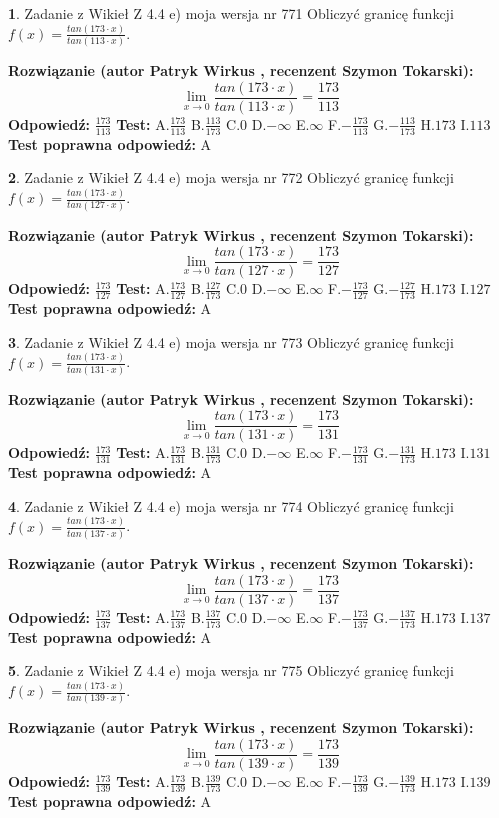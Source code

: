 \documentclass[12pt, a4paper]{article}
\theoremstyle{definition} %
\newtheorem{zad}{}
\newcommand{\zadStart}[1]{\begin{zad}#1\newline}
\newcommand{\zadStop}{\end{zad}}
\newcommand{\rozwStart}[2]{\noindent \textbf{Rozwiązanie (autor #1 , recenzent #2): }\newline}
\newcommand{\rozwStop}{\newline}
\newcommand{\odpStart}{\noindent \textbf{Odpowiedź:}\newline}
\newcommand{\odpStop}{\newline}
\newcommand{\testStart}{\noindent \textbf{Test:}\newline}
\newcommand{\testStop}{\newline}
\newcommand{\kluczStart}{\noindent \textbf{Test poprawna odpowiedź:}\newline}
\newcommand{\kluczStop}{\newline}
\begin{document}
\zadStart{Zadanie z Wikieł Z 4.4 e) moja wersja nr 771}
Obliczyć granicę funkcji $f(x)=\frac{tan(173\cdot x)}{tan(113\cdot x)}$.
\zadStop
\rozwStart{Patryk Wirkus}{Szymon Tokarski}
$$\lim\limits_{x\to 0}\frac{tan(173\cdot x)}{tan(113\cdot x)}=
\frac{173}{113}$$
\rozwStop
\odpStart
$\frac{173}{113}$
\odpStop
\testStart
A.$\frac{173}{113}$
B.$\frac{113}{173}$
C.$0$
D.$-\infty$
E.$\infty$
F.$-\frac{173}{113}$
G.$-\frac{113}{173}$
H.$173$
I.$113$
\testStop
\kluczStart
A
\kluczStop



\zadStart{Zadanie z Wikieł Z 4.4 e) moja wersja nr 772}
Obliczyć granicę funkcji $f(x)=\frac{tan(173\cdot x)}{tan(127\cdot x)}$.
\zadStop
\rozwStart{Patryk Wirkus}{Szymon Tokarski}
$$\lim\limits_{x\to 0}\frac{tan(173\cdot x)}{tan(127\cdot x)}=
\frac{173}{127}$$
\rozwStop
\odpStart
$\frac{173}{127}$
\odpStop
\testStart
A.$\frac{173}{127}$
B.$\frac{127}{173}$
C.$0$
D.$-\infty$
E.$\infty$
F.$-\frac{173}{127}$
G.$-\frac{127}{173}$
H.$173$
I.$127$
\testStop
\kluczStart
A
\kluczStop



\zadStart{Zadanie z Wikieł Z 4.4 e) moja wersja nr 773}
Obliczyć granicę funkcji $f(x)=\frac{tan(173\cdot x)}{tan(131\cdot x)}$.
\zadStop
\rozwStart{Patryk Wirkus}{Szymon Tokarski}
$$\lim\limits_{x\to 0}\frac{tan(173\cdot x)}{tan(131\cdot x)}=
\frac{173}{131}$$
\rozwStop
\odpStart
$\frac{173}{131}$
\odpStop
\testStart
A.$\frac{173}{131}$
B.$\frac{131}{173}$
C.$0$
D.$-\infty$
E.$\infty$
F.$-\frac{173}{131}$
G.$-\frac{131}{173}$
H.$173$
I.$131$
\testStop
\kluczStart
A
\kluczStop



\zadStart{Zadanie z Wikieł Z 4.4 e) moja wersja nr 774}
Obliczyć granicę funkcji $f(x)=\frac{tan(173\cdot x)}{tan(137\cdot x)}$.
\zadStop
\rozwStart{Patryk Wirkus}{Szymon Tokarski}
$$\lim\limits_{x\to 0}\frac{tan(173\cdot x)}{tan(137\cdot x)}=
\frac{173}{137}$$
\rozwStop
\odpStart
$\frac{173}{137}$
\odpStop
\testStart
A.$\frac{173}{137}$
B.$\frac{137}{173}$
C.$0$
D.$-\infty$
E.$\infty$
F.$-\frac{173}{137}$
G.$-\frac{137}{173}$
H.$173$
I.$137$
\testStop
\kluczStart
A
\kluczStop



\zadStart{Zadanie z Wikieł Z 4.4 e) moja wersja nr 775}
Obliczyć granicę funkcji $f(x)=\frac{tan(173\cdot x)}{tan(139\cdot x)}$.
\zadStop
\rozwStart{Patryk Wirkus}{Szymon Tokarski}
$$\lim\limits_{x\to 0}\frac{tan(173\cdot x)}{tan(139\cdot x)}=
\frac{173}{139}$$
\rozwStop
\odpStart
$\frac{173}{139}$
\odpStop
\testStart
A.$\frac{173}{139}$
B.$\frac{139}{173}$
C.$0$
D.$-\infty$
E.$\infty$
F.$-\frac{173}{139}$
G.$-\frac{139}{173}$
H.$173$
I.$139$
\testStop
\kluczStart
A
\kluczStop
\end{document}
